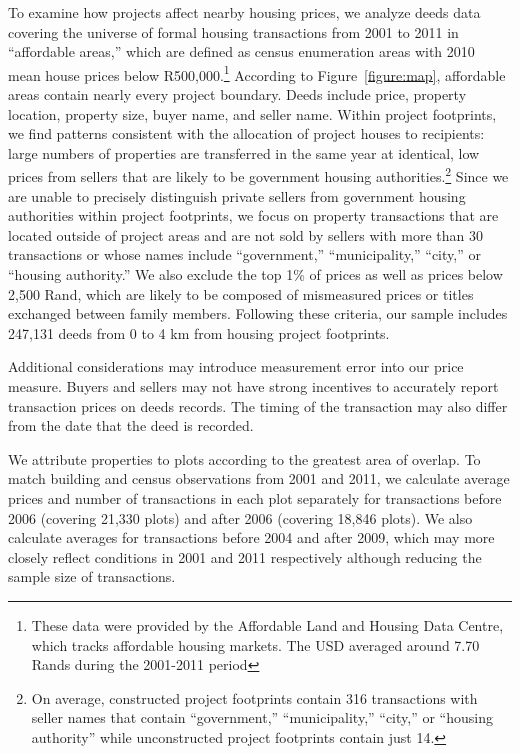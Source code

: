 \documentclass[12pt]{article}
\newcommand{\rv}{}
\begin{document}
To examine how projects affect nearby housing prices, we analyze deeds data covering the universe of \rv{formal} housing transactions from 2001 to 2011 in ``affordable areas,'' which are defined as census enumeration areas with 2010 mean house prices below R500,000.\footnote{These data were provided by the Affordable Land and Housing Data Centre, which tracks affordable housing markets.  The USD averaged around 7.70 Rands during the 2001-2011 period}  According to Figure~\ref{figure:map}, affordable areas contain nearly every project boundary.  Deeds include price, property location, property size, buyer name, and seller name.  Within project footprints, we find patterns consistent with the allocation of project houses to recipients: large numbers of properties are transferred in the same year at identical, low prices from sellers that are likely to be government housing authorities.\footnote{On average, constructed project footprints contain 316 transactions with seller names that contain ``government,'' ``municipality,'' ``city,'' or ``housing authority'' while unconstructed project footprints contain just 14.}  Since we are unable to precisely distinguish private sellers from government housing authorities within project footprints, we focus on property transactions that are located outside of project areas and are not sold by sellers with more than 30 transactions or whose names include ``government,'' ``municipality,'' ``city,'' or ``housing authority.''  We also exclude the top 1\% of prices as well as prices below 2,500 Rand, which are likely to be composed of mismeasured prices or titles exchanged between family members.  Following these criteria, our sample includes 247,131 deeds from 0 to 4 km from housing project footprints. 

\rv{Additional considerations may introduce measurement error into our price measure. Buyers and sellers may not have strong incentives to accurately report transaction prices on deeds records.  The timing of the transaction may also differ from the date that the deed is recorded.}

We attribute properties to plots according to the greatest area of overlap.  To match building and census observations from 2001 and 2011, we calculate average prices and number of transactions in each plot separately for transactions before 2006 (covering 21,330 plots) and after 2006 (covering 18,846 plots).  We also calculate averages for transactions before 2004 and after 2009, which may more closely reflect conditions in 2001 and 2011 respectively although reducing the sample size of transactions.
\end{document}
